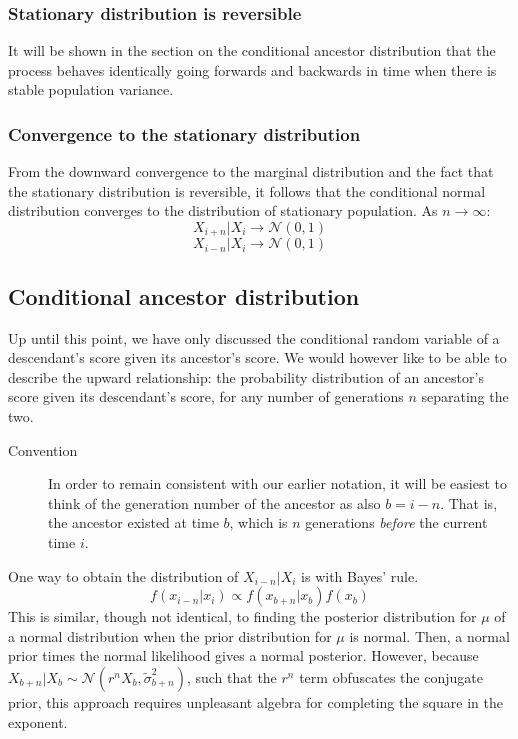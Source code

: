 \documentclass[a4paper,11pt]{article} %
\begin{document}
\subsubsection*{Stationary distribution is reversible}
It will be shown in the section on the conditional ancestor distribution that the process behaves identically going forwards and backwards in time when there is stable population variance.

\subsubsection*{Convergence to the stationary distribution}

From the downward convergence to the marginal distribution and the fact that the stationary distribution is reversible, it follows that the conditional normal distribution converges to the distribution of stationary population. 
As $n \rightarrow \infty$:
$$X_{i+n}|X_i \rightarrow \mathcal{N}(0, 1)$$
$$X_{i-n}|X_i \rightarrow \mathcal{N}(0, 1)$$



\subsection{Conditional ancestor distribution}

Up until this point, we have only discussed the conditional random variable of a descendant's score given its ancestor's score. We would however like to be able to describe the upward relationship: the probability distribution of an ancestor's score given its descendant's score, for any number of generations $n$ separating the two. 

\begin{description}
\item [Convention] In order to remain consistent with our earlier notation, it will be easiest to think of the generation number of the ancestor as also $b = i - n$. That is, the ancestor existed at time $b$, which is $n$ generations \emph{before} the current time $i$. 
\end{description}

One way to obtain the distribution of $X_{i-n}|X_i$ is with Bayes' rule. 
$$f(x_{i-n}|x_i) \propto f(x_{b+n}|x_b) f(x_b)$$
This is similar, though not identical, to finding the posterior distribution for $\mu$ of a normal distribution when the prior distribution for $\mu$ is normal. Then, a normal prior times the normal likelihood gives a normal posterior. However, because $X_{b+n}|X_b \sim \mathcal{N}(r^n X_b, \tilde{\sigma}_{b+n}^2)$, such that the $r^n$ term obfuscates the conjugate prior, this approach requires unpleasant algebra for completing the square in the exponent. 
\end{document}
